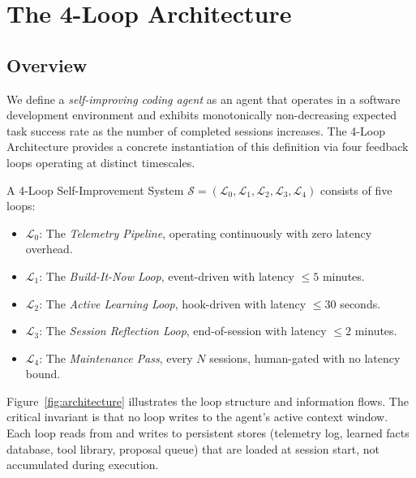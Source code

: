\section{The 4-Loop Architecture}

\label{sec:architecture}

\subsection{Overview}

We define a \emph{self-improving coding agent} as an agent that operates in
a software development environment and exhibits monotonically non-decreasing
expected task success rate as the number of completed sessions increases. The
4-Loop Architecture provides a concrete instantiation of this definition via
four feedback loops operating at distinct timescales.

\begin{definition}
\label{def:4loop}
A 4-Loop Self-Improvement System $\mathcal{S} = (\mathcal{L}_0, \mathcal{L}_1,
\mathcal{L}_2, \mathcal{L}_3, \mathcal{L}_4)$ consists of five loops:
\begin{itemize}[leftmargin=1.5em]
    \item $\mathcal{L}_0$: The \emph{Telemetry Pipeline}, operating continuously
          with zero latency overhead.
    \item $\mathcal{L}_1$: The \emph{Build-It-Now Loop}, event-driven with
          latency $\leq 5$ minutes.
    \item $\mathcal{L}_2$: The \emph{Active Learning Loop}, hook-driven with
          latency $\leq 30$ seconds.
    \item $\mathcal{L}_3$: The \emph{Session Reflection Loop}, end-of-session
          with latency $\leq 2$ minutes.
    \item $\mathcal{L}_4$: The \emph{Maintenance Pass}, every $N$ sessions,
          human-gated with no latency bound.
\end{itemize}
\end{definition}

Figure~\ref{fig:architecture} illustrates the loop structure and information
flows. The critical invariant is that no loop writes to the agent's active
context window. Each loop reads from and writes to persistent stores (telemetry
log, learned facts database, tool library, proposal queue) that are loaded at
session start, not accumulated during execution.

